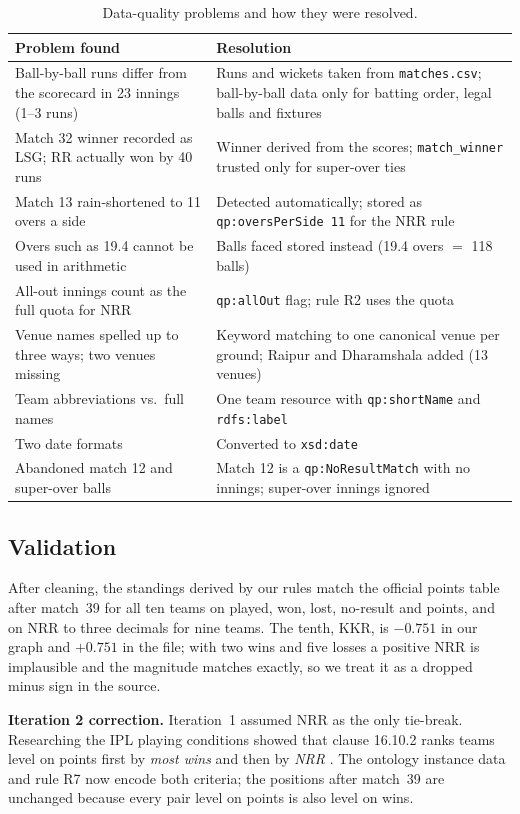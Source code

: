\begin{table}[H]\centering\small
\begin{tabular}{p{5.2cm}p{9.9cm}}
\toprule
\textbf{Problem found} & \textbf{Resolution} \\ \midrule
Ball-by-ball runs differ from the scorecard in 23 innings (1--3 runs) & Runs and wickets taken from \texttt{matches.csv}; ball-by-ball data only for batting order, legal balls and fixtures \\
Match 32 winner recorded as LSG; RR actually won by 40 runs & Winner derived from the scores; \texttt{match\_winner} trusted only for super-over ties \\
Match 13 rain-shortened to 11 overs a side & Detected automatically; stored as \texttt{qp:oversPerSide 11} for the NRR rule \\
Overs such as 19.4 cannot be used in arithmetic & Balls faced stored instead (19.4 overs $=$ 118 balls) \\
All-out innings count as the full quota for NRR & \texttt{qp:allOut} flag; rule R2 uses the quota \\
Venue names spelled up to three ways; two venues missing & Keyword matching to one canonical venue per ground; Raipur and Dharamshala added (13 venues) \\
Team abbreviations vs.\ full names & One team resource with \texttt{qp:shortName} and \texttt{rdfs:label} \\
Two date formats & Converted to \texttt{xsd:date} \\
Abandoned match 12 and super-over balls & Match 12 is a \texttt{qp:NoResultMatch} with no innings; super-over innings ignored \\
\bottomrule
\end{tabular}
\caption{Data-quality problems and how they were resolved.}
\end{table}

\subsection{Validation}
After cleaning, the standings derived by our rules match the official points table after match~39 for all
ten teams on played, won, lost, no-result and points, and on NRR to three decimals for nine teams. The tenth,
KKR, is $-0.751$ in our graph and $+0.751$ in the file; with two wins and five losses a positive NRR is
implausible and the magnitude matches exactly, so we treat it as a dropped minus sign in the source.

\textbf{Iteration 2 correction.} Iteration~1 assumed NRR as the only tie-break. Researching the IPL playing
conditions showed that clause 16.10.2 ranks teams level on points first by \emph{most wins} and then by
\emph{NRR} \citep{crictracker2024tiebreak}. The ontology instance data and rule R7 now encode both criteria;
the positions after match~39 are unchanged because every pair level on points is also level on wins.
